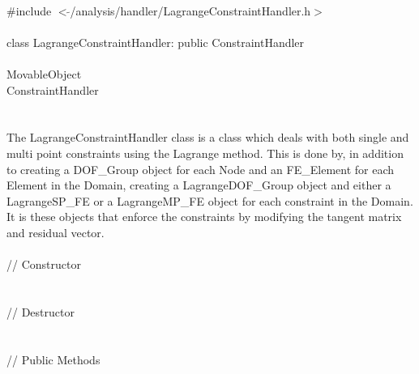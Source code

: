 
   \\
\indent \#include $<\tilde{
}$/analysis/handler/LagrangeConstraintHandler.h$>$  \\ 

  \\
\indent class LagrangeConstraintHandler: public ConstraintHandler  \\

 \\
\indent MovableObject \\
\indent\indent ConstraintHandler \\
\indent\indent{} \\

 \\ 
\indent The LagrangeConstraintHandler class is a class which deals with
both single and multi point constraints using the Lagrange
method. This is done by, in addition to creating a DOF\_Group object
for each Node and an FE\_Element for each Element in the Domain,
creating a LagrangeDOF\_Group object and either a LagrangeSP\_FE or a
LagrangeMP\_FE object for each constraint in the Domain. It is these
objects that enforce the constraints by modifying the tangent matrix
and residual vector. \\ 


 \\
\indent // Constructor \\
\\  \\ 
\indent // Destructor \\
\\  \\
\indent // Public Methods\\
 \\ 
 \\ \\
 \\
 \\


